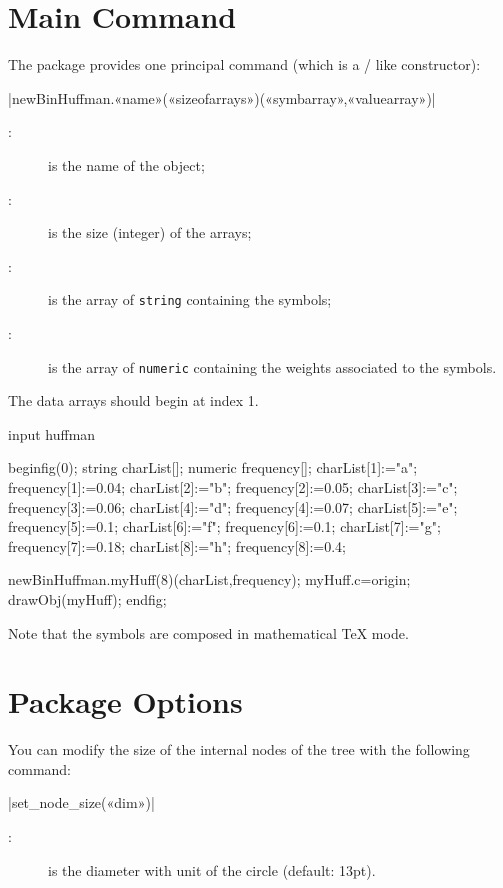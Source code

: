 \documentclass[english]{ltxdoc}
\begin{document}
\section{Main Command}

The package \huffman provides one principal command (which is a \MO/ like
constructor):

\commande|newBinHuffman.«name»(«sizeofarrays»)(«symbarray»,«valuearray»)|\smallskip{}


\begin{description}
  \item[:] is the name of the object;
  \item[:] is the size (integer) of the arrays;
  \item[:] is the array of \lstinline+string+ containing the
  symbols;
  \item[:] is the array of \lstinline+numeric+ containing the
  weights associated to the symbols.
\end{description}

The data arrays should begin at index 1.  

\begin{ExempleMP}
input huffman

beginfig(0);
string charList[];
numeric frequency[];
charList[1]:="a"; frequency[1]:=0.04;
charList[2]:="b"; frequency[2]:=0.05;
charList[3]:="c"; frequency[3]:=0.06;
charList[4]:="d"; frequency[4]:=0.07;
charList[5]:="e"; frequency[5]:=0.1;
charList[6]:="f"; frequency[6]:=0.1;
charList[7]:="g"; frequency[7]:=0.18;
charList[8]:="h"; frequency[8]:=0.4;

newBinHuffman.myHuff(8)(charList,frequency);
myHuff.c=origin;
drawObj(myHuff);
endfig;
\end{ExempleMP}

Note that the symbols are composed in mathematical \TeX{} mode. 
\section{Package Options}

You can modify the size of the internal nodes of the tree with the following
command:

\commande|set_node_size(«dim»)|\smallskip{}
\begin{description}
  \item[:] is the diameter with unit of the circle (default: 13pt).
\end{description} 
\end{document}
